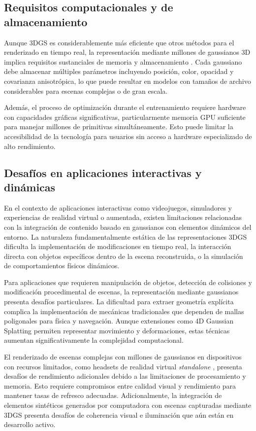 \documentclass[lettersize,journal]{IEEEtran}
\begin{document}
\subsection{Requisitos computacionales y de almacenamiento}

Aunque 3DGS es considerablemente más eficiente que otros métodos para el renderizado en tiempo real, la representación mediante millones de gaussianos 3D implica requisitos sustanciales de memoria y almacenamiento \cite{Kerbl2023, Wu2024}. Cada gaussiano debe almacenar múltiples parámetros incluyendo posición, color, opacidad y covarianza anisotrópica, lo que puede resultar en modelos con tamaños de archivo considerables para escenas complejas o de gran escala.

Además, el proceso de optimización durante el entrenamiento requiere hardware con capacidades gráficas significativas, particularmente memoria GPU suficiente para manejar millones de primitivas simultáneamente. Esto puede limitar la accesibilidad de la tecnología para usuarios sin acceso a hardware especializado de alto rendimiento.

\subsection{Desafíos en aplicaciones interactivas y dinámicas}

En el contexto de aplicaciones interactivas como videojuegos, simuladores y experiencias de realidad virtual o aumentada, existen limitaciones relacionadas con la integración de contenido basado en gaussianos con elementos dinámicos del entorno. La naturaleza fundamentalmente estática de las representaciones 3DGS dificulta la implementación de modificaciones en tiempo real, la interacción directa con objetos específicos dentro de la escena reconstruida, o la simulación de comportamientos físicos dinámicos.

Para aplicaciones que requieren manipulación de objetos, detección de colisiones y modificación procedimental de escenas, la representación mediante gaussianos presenta desafíos particulares. La dificultad para extraer geometría explícita \cite{Gudon2024} complica la implementación de mecánicas tradicionales que dependen de mallas poligonales para física y navegación. Aunque extensiones como 4D Gaussian Splatting \cite{Wu2024} permiten representar movimiento y deformaciones, estas técnicas aumentan significativamente la complejidad computacional.

El renderizado de escenas complejas con millones de gaussianos en dispositivos con recursos limitados, como headsets de realidad virtual \textit{standalone} \cite{MetaHorizon, Lian2024}, presenta desafíos de rendimiento adicionales debido a las limitaciones de procesamiento y memoria. Esto requiere compromisos entre calidad visual y rendimiento para mantener tasas de refresco adecuadas. Adicionalmente, la integración de elementos sintéticos generados por computadora con escenas capturadas mediante 3DGS presenta desafíos de coherencia visual e iluminación que aún están en desarrollo activo.
\end{document}
